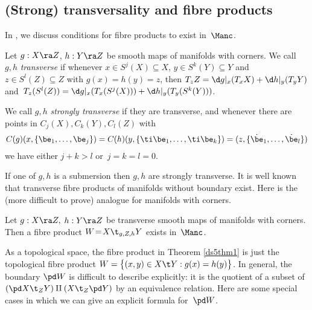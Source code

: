 \documentclass{article}
\begin{document}
\subsection{(Strong) transversality and fibre products}
\label{ds54}

In \cite[\S 6]{Joyc3}, \cite[\S 5.6]{Joyc6} we discuss conditions
for fibre products to exist in~$\Manc$.

\begin{dfn} Let $g:X\ra Z$, $h:Y\ra Z$ be smooth maps of manifolds
with corners. We call $g,h$ {\it transverse\/} if whenever $x\in
S^j(X)\subseteq X$, $y\in S^k(Y)\subseteq Y$ and $z\in
S^l(Z)\subseteq Z$ with $g(x)=h(y)=z$, then $T_zZ=\d
g\vert_x(T_xX)+\d h\vert_y(T_yY)$ and~$T_z(S^l(Z))=\d
g\vert_x(T_x(S^j(X)))+\d h\vert_y(T_y(S^k(Y)))$.

We call $g,h$ {\it strongly transverse\/} if they are transverse,
and whenever there are points in $C_j(X),C_k(Y),C_l(Z)$ with
\begin{equation*}
C(g)(x,\{\be_1,\ldots,\be_j\})=C(h)(y,\{\ti\be_1,\ldots,
\ti\be_k\})=(z,\{\dot\be_1,\ldots,\dot\be_l\})
\end{equation*}
we have either $j+k>l$ or~$j=k=l=0$.
\label{ds5def7}
\end{dfn}

If one of $g,h$ is a submersion then $g,h$ are strongly transverse.
It is well known that transverse fibre products of manifolds without
boundary exist. Here is the (more difficult to prove) analogue for
manifolds with corners.

\begin{thm} Let\/ $g:X\ra Z,$ $h:Y\ra Z$ be transverse smooth
maps of manifolds with corners. Then a fibre product\/
$W\!=\!X\t_{g,Z,h}Y$ exists in~$\Manc$.
\label{ds5thm1}
\end{thm}

As a topological space, the fibre product in Theorem \ref{ds5thm1}
is just the topological fibre product $W=\bigl\{(x,y)\in X\t
Y:g(x)=h(y)\bigr\}$. In general, the boundary $\pd W$ is difficult
to describe explicitly: it is the quotient of a subset of $(\pd
X\t_ZY)\amalg(X\t_Z\pd Y)$ by an equivalence relation. Here are some
special cases in which we can give an explicit formula for~$\pd
W$.
\end{document}
